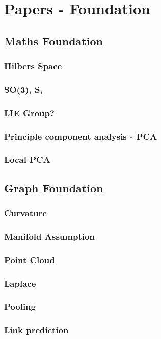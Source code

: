 \chapter{Papers - Foundation}

\section{Maths Foundation}
\subsection{Hilbers Space}
\subsection{SO(3), S,}
\subsection{LIE Group?}
\subsection{Principle component analysis - PCA}

\subsection{Local PCA}

\section{Graph Foundation}
\subsection{Curvature}
\subsection{Manifold Assumption}
\subsection{Point Cloud}
\subsection{Laplace}
\subsection{Pooling}
\subsection{Link prediction}
